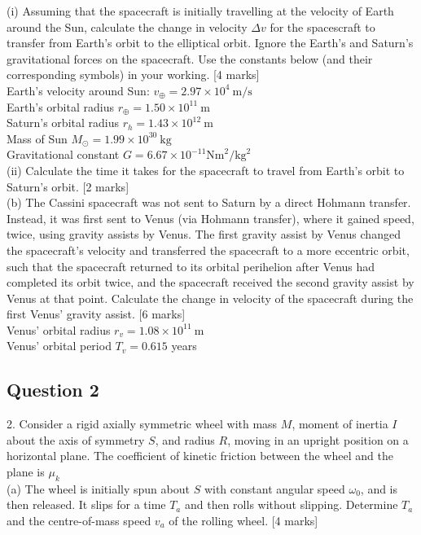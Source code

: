 \documentclass{article}
\begin{document}
(i) Assuming that the spacecraft is initially travelling at the velocity of Earth around the Sun, calculate the change in velocity $\Delta v$ for the spacescraft to transfer from Earth's orbit to the elliptical orbit. Ignore the Earth's and Saturn's gravitational forces on the spacecraft. Use the constants below (and their corresponding symbols) in your working. [4 marks] \\
Earth's velocity around Sun: $v_{\oplus}=2.97 \times 10^{4} \mathrm{~m} / \mathrm{s}$ \\
Earth's orbital radius $r_{\oplus}=1.50 \times 10^{11} \mathrm{~m}$ \\
Saturn's orbital radius $r_{h}=1.43 \times 10^{12} \mathrm{~m}$ \\
Mass of Sun $M_{\odot}=1.99 \times 10^{30} \mathrm{~kg}$ \\
Gravitational constant $G=6.67 \times 10^{-11} \mathrm{Nm}^{2} / \mathrm{kg}^{2}$ \\
(ii) Calculate the time it takes for the spacecraft to travel from Earth's orbit to Saturn's orbit. [2 marks] \\
(b) The Cassini spacecraft was not sent to Saturn by a direct Hohmann transfer. Instead, it was first sent to Venus (via Hohmann transfer), where it gained speed, twice, using gravity assists by Venus. The first gravity assist by Venus changed the spacecraft's velocity and transferred the spacecraft to a more eccentric orbit, such that the spacecraft returned to its orbital perihelion after Venus had completed its orbit twice, and the spacecraft received the second gravity assist by Venus at that point. Calculate the change in velocity of the spacecraft during the first Venus' gravity assist. [6 marks]\\
Venus' orbital radius $r_{v}=1.08 \times 10^{11} \mathrm{~m}$ \\
Venus' orbital period $T_{v}=0.615$ years \\

\subsection{Question 2}
2. Consider a rigid axially symmetric wheel with mass $M$, moment of inertia $I$ about the axis of symmetry $S$, and radius $R$, moving in an upright position on a horizontal plane. The coefficient of kinetic friction between the wheel and the plane is $\mu_{k}$ \\
(a) The wheel is initially spun about $S$ with constant angular speed $\omega_{0}$, and is then released. It slips for a time $T_{a}$ and then rolls without slipping. Determine $T_{a}$ and the centre-of-mass speed $v_{a}$ of the rolling wheel. [4 marks] \\ 
\end{document}
